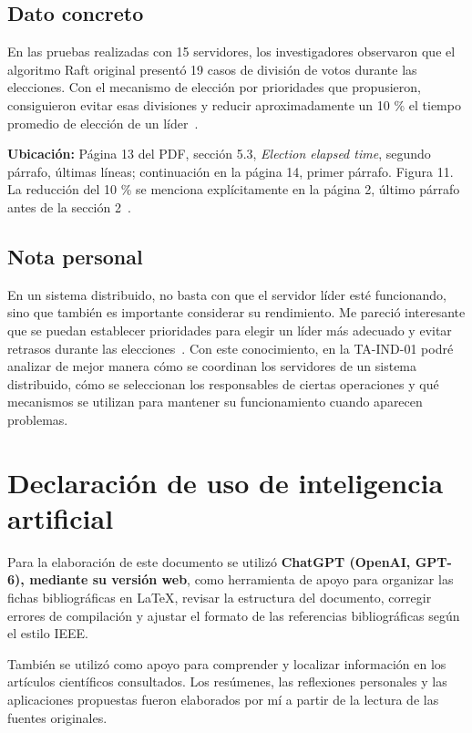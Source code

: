 \documentclass[12pt,a4paper]{article}
\begin{document}
\subsection*{Dato concreto}

En las pruebas realizadas con 15 servidores, los investigadores observaron que el algoritmo Raft original presentó 19 casos de división de votos durante las elecciones. Con el mecanismo de elección por prioridades que propusieron, consiguieron evitar esas divisiones y reducir aproximadamente un 10 \% el tiempo promedio de elección de un líder~\cite{du2023}.

\noindent\textbf{Ubicación:} Página 13 del PDF, sección 5.3, \textit{Election elapsed time}, segundo párrafo, últimas líneas; continuación en la página 14, primer párrafo. Figura 11. La reducción del 10 \% se menciona explícitamente en la página 2, último párrafo antes de la sección 2~\cite{du2023}.

\subsection*{Nota personal}

En un sistema distribuido, no basta con que el servidor líder esté funcionando, sino que también es importante considerar su rendimiento. Me pareció interesante que se puedan establecer prioridades para elegir un líder más adecuado y evitar retrasos durante las elecciones~\cite{du2023}. Con este conocimiento, en la TA-IND-01 podré analizar de mejor manera cómo se coordinan los servidores de un sistema distribuido, cómo se seleccionan los responsables de ciertas operaciones y qué mecanismos se utilizan para mantener su funcionamiento cuando aparecen problemas.

\section*{Declaración de uso de inteligencia artificial}

Para la elaboración de este documento se utilizó
\textbf{ChatGPT (OpenAI, GPT-6), mediante su versión web},
como herramienta de apoyo para organizar las fichas
bibliográficas en LaTeX, revisar la estructura del documento,
corregir errores de compilación y ajustar el formato de las
referencias bibliográficas según el estilo IEEE.

También se utilizó como apoyo para comprender y localizar
información en los artículos científicos consultados.
Los resúmenes, las reflexiones personales y las aplicaciones
propuestas fueron elaborados por mí a partir de la lectura
de las fuentes originales.
\end{document}
